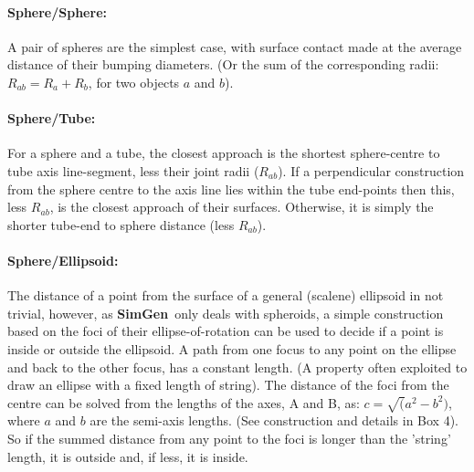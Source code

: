 \documentclass[review]{elsarticle}
\newcommand{\TT}[1]{{\ttfamily\bfseries #1}}
\newcommand{\NAME}{{\TT{SimGen}}}
\begin{document}
{{{{{\paragraph{Sphere/Sphere:\\}

A pair of spheres are the simplest case, with surface contact made at the average distance of their bumping diameters.
(Or the sum of the corresponding radii: $R_{ab} = R_a + R_b$, for two objects $a$ and $b$).

\paragraph{Sphere/Tube:\\}

For a sphere and a tube, the closest approach is the shortest sphere-centre to tube axis 
line-segment, less their joint radii ($R_{ab}$).   If a perpendicular construction from the 
sphere centre to the axis line lies within the tube end-points then this, less $R_{ab}$,
is the closest approach of their surfaces.  Otherwise, it is simply the shorter tube-end to
sphere distance (less $R_{ab}$).

\paragraph{Sphere/Ellipsoid:\\}

The distance of a point from the surface of a general (scalene) ellipsoid in not trivial,
however, as \NAME\ only deals with spheroids, a simple construction based on the foci of
their ellipse-of-rotation can be used to decide if a point is inside or outside the ellipsoid.
A path from one focus to any point on the ellipse and back to the other focus, has a constant
length.  (A property often exploited to draw an ellipse with a fixed length of string).
The distance of the foci from the centre can be solved from the lengths of the axes, A and B,
as: $c = \surd(a^2-b^2)$, where $a$ and $b$ are the semi-axis lengths.  (See construction and details in Box 4).
So if the summed distance from any point to the foci is longer than the 'string' length, it is outside
and, if less, it is inside.

}}}}}
\end{document}
